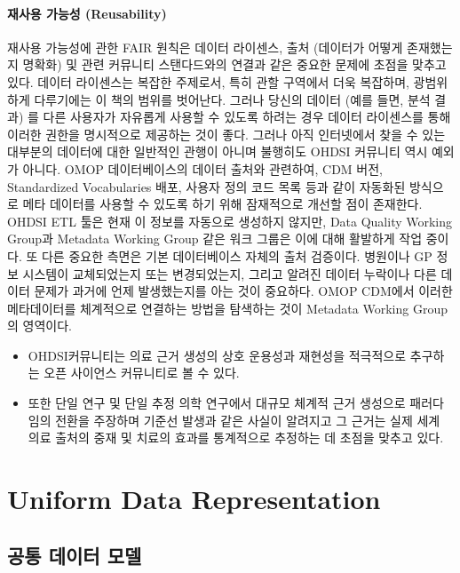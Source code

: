 \documentclass[11pt]{book}
\theoremstyle{definition}
\theoremstyle{definition}
\theoremstyle{definition}
\theoremstyle{remark}
\let\BeginKnitrBlock\begin \let\EndKnitrBlock\end
\begin{document}
\subsection{재사용 가능성 (Reusability)}\label{--reusability}

재사용 가능성에 관한 FAIR 원칙은 데이터 라이센스, 출처 (데이터가 어떻게
존재했는지 명확화) 및 관련 커뮤니티 스탠다드와의 연결과 같은 중요한
문제에 초점을 맞추고 있다. 데이터 라이센스는 복잡한 주제로서, 특히 관할
구역에서 더욱 복잡하며, 광범위하게 다루기에는 이 책의 범위를 벗어난다.
그러나 당신의 데이터 (예를 들면, 분석 결과) 를 다른 사용자가 자유롭게
사용할 수 있도록 하려는 경우 데이터 라이센스를 통해 이러한 권한을
명시적으로 제공하는 것이 좋다. 그러나 아직 인터넷에서 찾을 수 있는
대부분의 데이터에 대한 일반적인 관행이 아니며 불행히도 OHDSI 커뮤니티
역시 예외가 아니다. OMOP 데이터베이스의 데이터 출처와 관련하여, CDM
버전, Standardized Vocabularies 배포, 사용자 정의 코드 목록 등과 같이
자동화된 방식으로 메타 데이터를 사용할 수 있도록 하기 위해 잠재적으로
개선할 점이 존재한다. OHDSI ETL 툴은 현재 이 정보를 자동으로 생성하지
않지만, Data Quality Working Group과 Metadata Working Group 같은 워크
그룹은 이에 대해 활발하게 작업 중이다. 또 다른 중요한 측면은 기본
데이터베이스 자체의 출처 검증이다. 병원이나 GP 정보 시스템이
교체되었는지 또는 변경되었는지, 그리고 알려진 데이터 누락이나 다른
데이터 문제가 과거에 언제 발생했는지를 아는 것이 중요하다. OMOP CDM에서
이러한 메타데이터를 체계적으로 연결하는 방법을 탐색하는 것이 Metadata
Working Group의 영역이다.

\BeginKnitrBlock{rmdsummary}
\begin{itemize}
\item
  OHDSI커뮤니티는 의료 근거 생성의 상호 운용성과 재현성을 적극적으로
  추구하는 오픈 사이언스 커뮤니티로 볼 수 있다.
\item
  또한 단일 연구 및 단일 추정 의학 연구에서 대규모 체계적 근거 생성으로
  패러다임의 전환을 주장하며 기준선 발생과 같은 사실이 알려지고 그
  근거는 실제 세계 의료 출처의 중재 및 치료의 효과를 통계적으로 추정하는
  데 초점을 맞추고 있다.
\end{itemize}
\EndKnitrBlock{rmdsummary}

\part{Uniform Data
Representation}\label{part-uniform-data-representation}

\chapter{공통 데이터 모델}\label{CommonDataModel}
\end{document}
